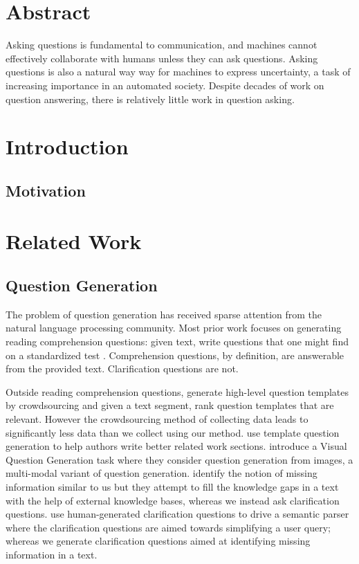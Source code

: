 \documentclass[11pt]{article}
\begin{document}
\section{Abstract}

Asking questions is fundamental to communication, and machines cannot effectively collaborate with humans unless they can ask questions. Asking questions is also a natural way way for machines to express uncertainty, a task of increasing importance in an automated society. Despite decades of work on question answering, there is relatively little work in question asking.

\section{Introduction}

\subsection{Motivation}


\section{Related Work}

\subsection{Question Generation}

The problem of question generation has received sparse attention from the natural language processing community. Most prior work focuses on generating reading comprehension questions:  given text, write questions that one might find on a standardized test \cite{vanderwende2008importance,heilman2011automatic,rus2011question,olney2012question}.  Comprehension questions, by definition, are answerable from the provided text. Clarification questions are not.  

Outside reading comprehension questions, \cite{labutov2015deep} generate high-level question templates by crowdsourcing and given a text segment, rank question templates that are relevant. However the crowdsourcing method of collecting data leads to significantly less data than we collect using our method. \cite{liu2010automatic} use template question generation to help authors write better related work sections. \cite{mostafazadeh2016generating} introduce a Visual Question Generation task where they consider question generation from images, a multi-modal variant of question generation. 
\cite{penas2010filling} identify the notion of missing information similar to us but they attempt to fill the knowledge gaps in a text with the help of external knowledge bases, whereas we instead ask clarification questions. \cite{artzi2011bootstrapping} use human-generated clarification questions to drive a semantic parser where the clarification questions are aimed towards simplifying a user query; whereas we generate clarification questions aimed at  identifying missing information in a text. 
\end{document}
